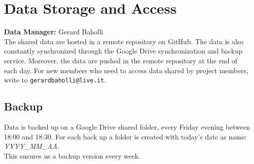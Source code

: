 \section{Data Storage and Access}
\textbf{Data Manager:} Gerard Baholli\\
The shared data are hosted in a remote repository on GitHub. The data is also constantly synchronized through the Google Drive synchronization and backup service. Moreover, the data are pushed in the remote repository at the end of each day. For new members who need to access data shared by project members, write to \texttt{gerardbaholli@live.it}.

\subsection{Backup}
Data is backed up on a Google Drive shared folder, every Friday evening between 18:00 and 18:30. For each back up a folder is created with today's date as name: \textit{YYYY\_MM\_AA}.\\
This ensures us a backup version every week.
